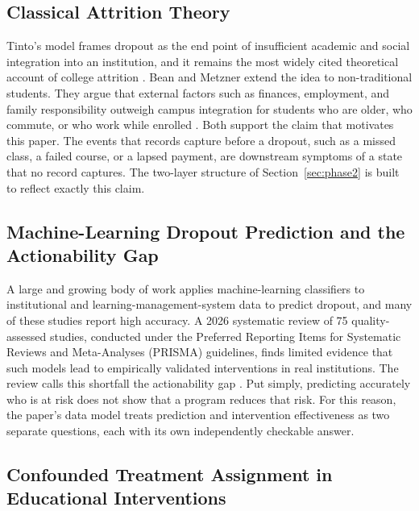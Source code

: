 \documentclass[11pt]{article}
\begin{document}
\subsection{Classical Attrition Theory}
\label{sec:related-A}

\hspace*{\parindent}Tinto's model frames dropout as the end point of insufficient academic and social integration into an institution, and it remains the most widely cited theoretical account of college attrition \citep{tinto1975}. Bean and Metzner extend the idea to non-traditional students. They argue that external factors such as finances, employment, and family responsibility outweigh campus integration for students who are older, who commute, or who work while enrolled \citep{bean1985}. Both support the claim that motivates this paper. The events that records capture before a dropout, such as a missed class, a failed course, or a lapsed payment, are downstream symptoms of a state that no record captures. The two-layer structure of Section~\ref{sec:phase2} is built to reflect exactly this claim.

\subsection{Machine-Learning Dropout Prediction and the Actionability Gap}
\label{sec:related-B}

\hspace*{\parindent}A large and growing body of work applies machine-learning classifiers to institutional and learning-management-system data to predict dropout, and many of these studies report high accuracy. A 2026 systematic review of 75 quality-assessed studies, conducted under the Preferred Reporting Items for Systematic Reviews and Meta-Analyses (PRISMA) guidelines, finds limited evidence that such models lead to empirically validated interventions in real institutions. The review calls this shortfall the actionability gap \citep{dropout2026review}. Put simply, predicting accurately who is at risk does not show that a program reduces that risk. For this reason, the paper's data model treats prediction and intervention effectiveness as two separate questions, each with its own independently checkable answer.

\subsection{Confounded Treatment Assignment in Educational Interventions}
\label{sec:related-C}
\end{document}
